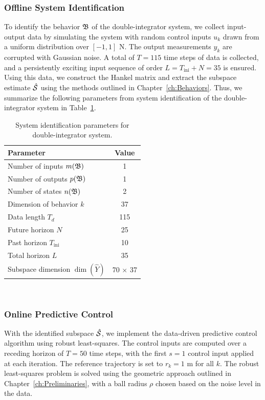 \subsubsection{Offline System Identification}
To identify the behavior $\mathfrak{B}$ of the double-integrator system, we collect input-output data by simulating the system with random control inputs $u_k$ drawn from a uniform distribution over $[-1, 1]$ N. The output measurements $y_k$ are corrupted with Gaussian noise. A total of $T = 115$ time steps of data is collected, and a persistently exciting input sequence of order $L = T_{\textrm{ini}}+N = 35$ is ensured. Using this data, we construct the Hankel matrix and extract the subspace estimate $\hat{\mathcal{S}}$ using the methods outlined in Chapter~\ref{ch:Behaviors}. Thus, we summarize the following parameters from system identification of the double-integrator system in Table~\ref{tab:sysid_params_double_integrator}.
\begin{table}[h]
    \centering
    \begin{tabular}{l|c}
        \textbf{Parameter} & \textbf{Value} \\
        \hline 
        \hline
        Number of inputs $m(\mathfrak{B})$ & 1 \\
        Number of outputs $p(\mathfrak{B})$ & 1 \\
        Number of states $n(\mathfrak{B})$ & 2 \\
        Dimension of behavior $k$ & 37 \\
        Data length $T_d$ & 115 \\
        Future horizon $N$ & 25 \\
        Past horizon $T_{\textrm{ini}}$ & 10 \\
        Total horizon $L$ & 35 \\
        Subspace dimension $\dim(\hat{Y})$ & 70 $\times$ 37 \\
        \hline
    \end{tabular}
    \caption{System identification parameters for double-integrator system.}~\label{tab:sysid_params_double_integrator}
\end{table}

\subsubsection{Online Predictive Control}
With the identified subspace $\hat{\mathcal{S}}$, we implement the data-driven predictive control algorithm using robust least-squares. The control inputs are computed over a receding horizon of $T = 50$ time steps, with the first $s = 1$ control input applied at each iteration. The reference trajectory is set to $r_k = 1$ m for all $k$. The robust least-squares problem is solved using the geometric approach outlined in Chapter~\ref{ch:Preliminaries}, with a ball radius $\rho$ chosen based on the noise level in the data.


